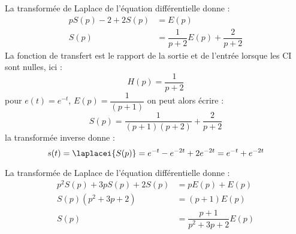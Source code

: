 La transformée de Laplace de l'équation différentielle donne :
\begin{align*}
    pS(p)-2+2S(p)&=E(p)\\
    S(p)&=\dfrac{1}{p+2}E(p)+\dfrac{2}{p+2}
\end{align*}
La fonction de transfert est le rapport de la sortie et de l'entrée lorsque 
les CI sont nulles, ici :
\[
H(p)=\dfrac{1}{p+2}
\]
pour $e(t)=e^{-t}$, $E(p)=\dfrac{1}{(p+1)}$ on peut alors écrire :
\[
S(p)=\dfrac{1}{(p+1)(p+2)}+\dfrac{2}{p+2}
\]
la transformée inverse donne :
\[
s(t) = \laplacei{S(p)}=e^{-t}-e^{-2t}+2e^{-2t}=e^{-t}+e^{-2t}
\]
\begin{center}
\end{center}
\newpage
\question{}
La transformée de Laplace de l'équation différentielle donne :
\begin{align*}
    p^2S(p)+3pS(p)+2S(p)&=pE(p)+E(p)\\
    S(p)(p^2+3p+2)&=(p+1)E(p)\\
    S(p) &= \dfrac{p+1}{p^2+3p+2}E(p)
\end{align*}
